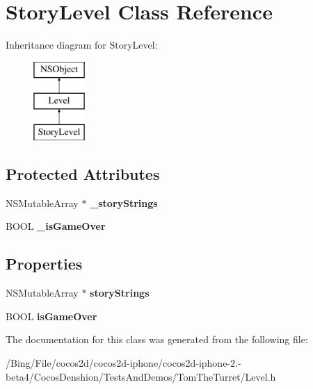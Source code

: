 \hypertarget{interface_story_level}{\section{Story\-Level Class Reference}
\label{interface_story_level}
}
Inheritance diagram for Story\-Level\-:\begin{figure}[H]
\begin{center}
\leavevmode
\includegraphics[height=3.000000cm]{interface_story_level}
\end{center}
\end{figure}
\subsection*{Protected Attributes}
\begin{DoxyCompactItemize}
\item 
\hypertarget{interface_story_level_a026202b2f60918a7c555bb823d6d2e0d}{N\-S\-Mutable\-Array $\ast$ {\bfseries \-\_\-story\-Strings}}\label{interface_story_level_a026202b2f60918a7c555bb823d6d2e0d}

\item 
\hypertarget{interface_story_level_acdf27e731cf4cdb4adf7df2189547eaf}{B\-O\-O\-L {\bfseries \-\_\-is\-Game\-Over}}\label{interface_story_level_acdf27e731cf4cdb4adf7df2189547eaf}

\end{DoxyCompactItemize}
\subsection*{Properties}
\begin{DoxyCompactItemize}
\item 
\hypertarget{interface_story_level_a551f5878b0dee0fb25eeccfe5821fca0}{N\-S\-Mutable\-Array $\ast$ {\bfseries story\-Strings}}\label{interface_story_level_a551f5878b0dee0fb25eeccfe5821fca0}

\item 
\hypertarget{interface_story_level_a456651ba4770c4235febc9274e26ea9e}{B\-O\-O\-L {\bfseries is\-Game\-Over}}\label{interface_story_level_a456651ba4770c4235febc9274e26ea9e}

\end{DoxyCompactItemize}


The documentation for this class was generated from the following file\-:\begin{DoxyCompactItemize}
\item 
/\-Bing/\-File/cocos2d/cocos2d-\/iphone/cocos2d-\/iphone-\/2.-\/beta4/\-Cocos\-Denshion/\-Tests\-And\-Demos/\-Tom\-The\-Turret/Level.\-h\end{DoxyCompactItemize}

